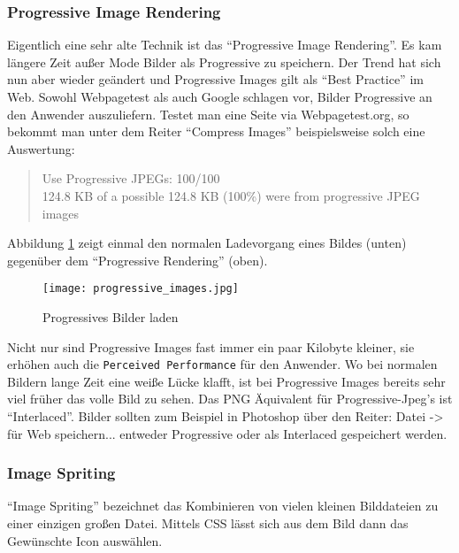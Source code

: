 		\subsubsection{Progressive Image Rendering} %
		\label{ssub:progressive_image_rendering}
			Eigentlich eine sehr alte Technik ist das "`Progressive Image Rendering"'. Es kam längere Zeit außer Mode Bilder als Progressive zu speichern. Der Trend hat sich nun aber wieder geändert und Progressive Images gilt als "`Best Practice"' im Web. Sowohl Webpagetest als auch Google schlagen vor, Bilder Progressive an den Anwender auszuliefern. Testet man eine Seite via Webpagetest.org, so bekommt man unter dem Reiter "`Compress Images"' beispielsweise solch eine Auswertung:
			\begin{quote}
				Use Progressive JPEGs: 100/100\\
				124.8 KB of a possible 124.8 KB (100\%) were from progressive JPEG images
			\end{quote}

			Abbildung \ref{fig:progressive_images} zeigt einmal den normalen Ladevorgang eines Bildes (unten) gegenüber dem "`Progressive Rendering"' (oben).

			\begin{figure}[htbp]
				\begin{center}
					\texttt{[image: progressive\_images.jpg]}
					\caption{Progressives Bilder laden}
					\label{fig:progressive_images}
				\end{center}
			\end{figure}

			Nicht nur sind Progressive Images fast immer ein paar Kilobyte kleiner, sie erhöhen auch die \texttt{Perceived Performance} für den Anwender. Wo bei normalen Bildern lange Zeit eine weiße Lücke klafft, ist bei Progressive Images bereits sehr viel früher das volle Bild zu sehen. Das PNG Äquivalent für Progressive-Jpeg's ist "`Interlaced"'. Bilder sollten zum Beispiel in Photoshop über den Reiter: Datei -> für Web speichern... entweder Progressive oder als Interlaced gespeichert werden.

		\subsubsection{Image Spriting} %
		\label{ssub:image_spriting}
			"`Image Spriting"' bezeichnet das Kombinieren von vielen kleinen Bilddateien zu einer einzigen großen Datei.  Mittels CSS lässt sich aus dem Bild dann das Gewünschte Icon auswählen.

